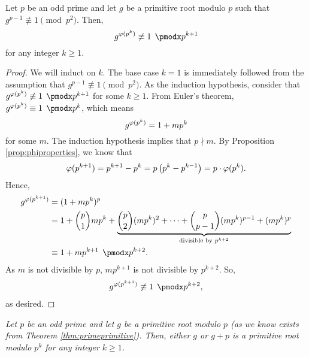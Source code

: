 \documentclass{subfile}
\begin{document}
	\begin{lemma}
		Let $p$ be an odd prime and let $g$ be a primitive root modulo $p$ such that $g^{p-1} \not \equiv 1 \pmod{p^2}$. Then, $$g^{\t(p^k)} \not \equiv 1 \pmod{p^{k+1}}$$ for any integer $k \geq 1$.
	\end{lemma}
	
	\begin{proof}
		We will induct on $k$. The base case $k=1$ is immediately followed from the assumption that $g^{p-1} \not \equiv 1 \pmod{p^2}$. As the induction hypothesis, consider that $g^{\t(p^k)} \not \equiv 1 \pmod{p^{k+1}}$ for some $k\geq 1$. From Euler's theorem, $g^{\t(p^k)} \equiv 1 \pmod{p^k}$, which means $$g^{\varphi(p^k)} = 1+mp^k$$ for some $m$. The induction hypothesis implies that $p \nmid m$. By Proposition \ref{prop:phiproperties}, we know that $$\varphi(p^{k+1})=p^{k+1}-p^k=p\left(p^k - p^{k-1}\right)=p\cdot \varphi(p^k).$$
		Hence,
			\begin{align*}
				g^{\t(p^{k+1})} &= (1+mp^k)^p \\
								&= 1+ \binom{p}{1}mp^k + \underbrace{\binom{p}{2} (mp^k)^2 + \cdots +\binom{p}{p-1} (mp^k)^{p-1} +(mp^k)^p}_{\text{divisible by }p^{k+2}}\\
								&\equiv 1+mp^{k+1} \pmod {p^{k+2}}.
			\end{align*}
		As $m$ is not divisible by $p$, $mp^{k+1}$ is not divisible by $p^{k+2}$. So,
			\begin{align*}
				g^{\t(p^{k+1})} \not \equiv 1 \pmod {p^{k+2}},
			\end{align*}
		as desired.
	\end{proof}
	
	\begin{theorem}\slshape\label{thm:primepowerprimitive}
		Let $p$ be an odd prime and let $g$ be a primitive root modulo $p$ (as we know exists from Theorem \ref{thm:primeprimitive}). Then, either $g$ or $g+p$ is a primitive root modulo $p^k$ for any integer $k\geq 1$.
	\end{theorem}
	
\end{document}
